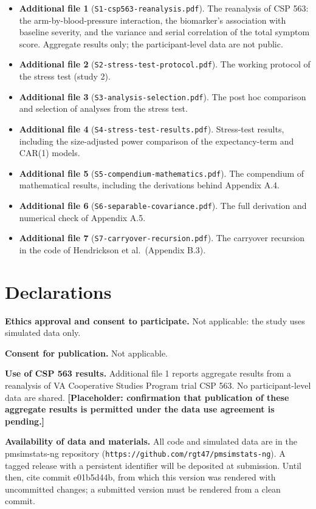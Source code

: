\documentclass[
  11pt,
]{article}
\providecommand{\tightlist}{%
  \setlength{\itemsep}{0pt}\setlength{\parskip}{0pt}}
\begin{document}
\begin{itemize}
\tightlist
\item
  \textbf{Additional file 1} (\texttt{S1-csp563-reanalysis.pdf}). The reanalysis
  of CSP 563: the arm-by-blood-pressure interaction, the biomarker's
  association with baseline severity, and the variance and serial
  correlation of the total symptom score. Aggregate results only; the
  participant-level data are not public.
\item
  \textbf{Additional file 2} (\texttt{S2-stress-test-protocol.pdf}). The working
  protocol of the stress test (study 2).
\item
  \textbf{Additional file 3} (\texttt{S3-analysis-selection.pdf}). The post hoc
  comparison and selection of analyses from the stress test.
\item
  \textbf{Additional file 4} (\texttt{S4-stress-test-results.pdf}). Stress-test
  results, including the size-adjusted power comparison of the
  expectancy-term and CAR(1) models.
\item
  \textbf{Additional file 5} (\texttt{S5-compendium-mathematics.pdf}). The
  compendium of mathematical results, including the derivations
  behind Appendix A.4.
\item
  \textbf{Additional file 6} (\texttt{S6-separable-covariance.pdf}). The full
  derivation and numerical check of Appendix A.5.
\item
  \textbf{Additional file 7} (\texttt{S7-carryover-recursion.pdf}). The carryover
  recursion in the code of Hendrickson et al.~(Appendix B.3).
\end{itemize}

\section*{Declarations}\label{declarations}

\textbf{Ethics approval and consent to participate.} Not applicable: the
study uses simulated data only.

\textbf{Consent for publication.} Not applicable.

\textbf{Use of CSP 563 results.} Additional file 1 reports aggregate results
from a reanalysis of VA Cooperative Studies Program trial CSP 563. No
participant-level data are shared. \textbf{[Placeholder: confirmation
that publication of these aggregate results is permitted under the
data use agreement is pending.]}

\textbf{Availability of data and materials.} All code and simulated data
are in the pmsimstats-ng repository
(\texttt{https://github.com/rgt47/pmsimstats-ng}). A tagged release with a
persistent identifier will be deposited at submission. Until then,
cite commit e01b5d44b, from which this version was rendered with uncommitted changes; a submitted version must be rendered from a clean commit.
\end{document}
